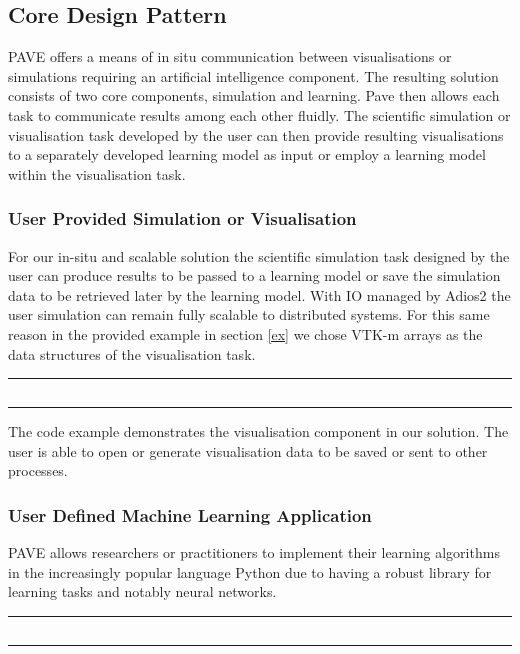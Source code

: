 \documentclass[conference]{IEEEtran}
\begin{document}
\subsection{Core Design Pattern}
 
PAVE offers a means of in situ communication between visualisations or simulations requiring an artificial intelligence component. The resulting solution consists of two core components, simulation and learning. Pave then allows each task to communicate results among each other fluidly. The scientific simulation or visualisation task developed by the user can then provide resulting visualisations to a separately developed learning model as input or employ a learning model within the visualisation task.  

\subsubsection{User Provided Simulation or Visualisation}

For our in-situ and scalable solution the scientific simulation task designed by the user can produce results to be passed to a learning model or save the simulation data to be retrieved later by the learning model. With IO managed by Adios2 the user simulation can remain fully scalable to distributed systems. For this same reason in the provided example in section \ref{ex} we chose VTK-m arrays as the data structures of the visualisation task.
\noindent\rule{0.5\textwidth}{1pt}
\inputminted{cpp}{pave_pt.py}\label{PAVEvis}
\noindent\rule{0.5\textwidth}{1pt}

The code example  demonstrates the visualisation component in our solution. The user is able to open or generate visualisation data to be saved or sent to other processes. 

\subsubsection{User Defined Machine Learning Application}

PAVE allows researchers or practitioners to implement their learning algorithms in the increasingly popular language Python due to having a robust library for learning tasks and notably neural networks. 

\noindent\rule{0.5\textwidth}{1pt}\label{PAVElearn}
\inputminted{python}{pave.py}
\noindent\rule{0.5\textwidth}{1pt}
\end{document}
